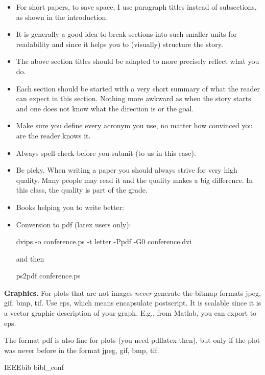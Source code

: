 \documentclass[letterpaper]{article}
\newcommand{\mypar}[1]{{\bf #1.}} %
\begin{document}
	\begin{itemize}
	\item For short papers, to save space, I use paragraph titles instead of
	subsections, as shown in the introduction.
	
	\item It is generally a good idea to break sections into such smaller
	units for readability and since it helps you to (visually) structure the story.
	
	\item The above section titles should be adapted to more precisely
	reflect what you do.
	
	\item Each section should be started with a very
	short summary of what the reader can expect in this section. Nothing
	more awkward as when the story starts and one does not know what the
	direction is or the goal.
	
	\item Make sure you define every acronym you use, no matter how
	convinced you are the reader knows it.
	
	\item Always spell-check before you submit (to us in this case).
	
	\item Be picky. When writing a paper you should always strive for very
	high quality. Many people may read it and the quality makes a big difference.
	In this class, the quality is part of the grade.
	
	\item Books helping you to write better:
	
	\item Conversion to pdf (latex users only): 
	
	dvips -o conference.ps -t letter -Ppdf -G0 conference.dvi
	
	and then
	
	ps2pdf conference.ps
	\end{itemize}
	
	\mypar{Graphics} For plots that are not images {\em never} generate the bitmap formats
	jpeg, gif, bmp, tif. Use eps, which means encapsulate postscript. It is
	scalable since it is a vector graphic description of your graph. E.g.,
	from Matlab, you can export to eps.
	
	The format pdf is also fine for plots (you need pdflatex then), but only if the plot was never before in the format 
	jpeg, gif, bmp, tif.


	 	{IEEEbib} %
	 		{bibl_conf}
\end{document}
